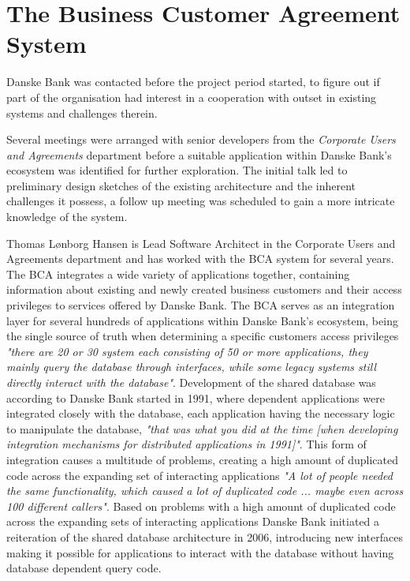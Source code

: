 
\section{The Business Customer Agreement System}
Danske Bank was contacted before the project period started, to figure out if part of the organisation had interest in a cooperation with outset in existing systems and challenges therein. 

Several meetings were arranged with senior developers from the \textit{Corporate Users and Agreements} department before a suitable application within Danske Bank's ecosystem was identified for further exploration. The initial talk led to preliminary design sketches of the existing architecture and the inherent challenges it possess, a follow up meeting was scheduled to gain a more intricate knowledge of the system.

Thomas Lønborg Hansen is Lead Software Architect in the Corporate Users and Agreements department and has worked with the BCA system for several years. The BCA integrates a wide variety of applications together, containing information about existing and newly created business customers and their access privileges to services offered by Danske Bank. The BCA serves as an integration layer for several hundreds of applications within Danske Bank's ecosystem, being the single source of truth when determining a specific customers access privileges \textit{"there are 20 or 30 system each consisting of 50 or more applications, they mainly query the database through interfaces, while some legacy systems still directly interact with the database"}. Development of the shared database was according to Danske Bank started in 1991, where dependent applications were integrated closely with the database, each application having the necessary logic to manipulate the database, \textit{"that was what you did at the time [when developing integration mechanisms for distributed applications in 1991]"}. This form of integration causes a multitude of problems, creating a high amount of duplicated code across the expanding set of interacting applications \textit{"A lot of people needed the same functionality, which caused a lot of duplicated code ... maybe even across 100 different callers"}. Based on problems with a high amount of duplicated code across the expanding sets of interacting applications Danske Bank initiated a reiteration of the shared database architecture in 2006, introducing new interfaces making it possible for applications to interact with the database without having database dependent query code.

